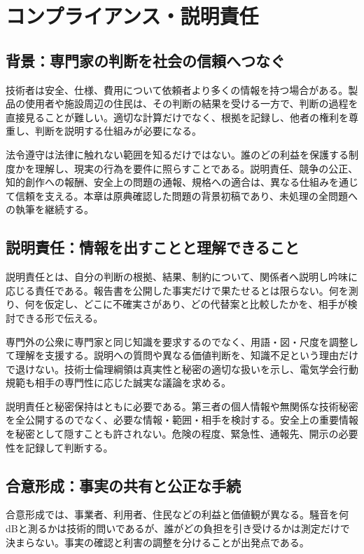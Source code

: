 \chapter{コンプライアンス・説明責任}

\section{背景：専門家の判断を社会の信頼へつなぐ}
技術者は安全、仕様、費用について依頼者より多くの情報を持つ場合がある。製品の使用者や施設周辺の住民は、その判断の結果を受ける一方で、判断の過程を直接見ることが難しい。適切な計算だけでなく、根拠を記録し、他者の権利を尊重し、判断を説明する仕組みが必要になる。

法令遵守は法律に触れない範囲を知るだけではない。誰のどの利益を保護する制度かを理解し、現実の行為を要件に照らすことである。説明責任、競争の公正、知的創作への報酬、安全上の問題の通報、規格への適合は、異なる仕組みを通じて信頼を支える。本章は原典確認した問題の背景初稿であり、未処理の全問題への執筆を継続する。

\section{説明責任：情報を出すことと理解できること}
\label{theory:compliance:accountability}
説明責任とは、自分の判断の根拠、結果、制約について、関係者へ説明し吟味に応じる責任である。報告書を公開した事実だけで果たせるとは限らない。何を測り、何を仮定し、どこに不確実さがあり、どの代替案と比較したかを、相手が検討できる形で伝える。

専門外の公衆に専門家と同じ知識を要求するのでなく、用語・図・尺度を調整して理解を支援する。説明への質問や異なる価値判断を、知識不足という理由だけで退けない。技術士倫理綱領は真実性と秘密の適切な扱いを示し、電気学会行動規範も相手の専門性に応じた誠実な議論を求める\parencite{ipej_ethics2011,ieej_conduct2007}。

説明責任と秘密保持はともに必要である。第三者の個人情報や無関係な技術秘密を全公開するのでなく、必要な情報・範囲・相手を検討する。安全上の重要情報を秘密として隠すことも許されない。危険の程度、緊急性、通報先、開示の必要性を記録して判断する。

\section{合意形成：事実の共有と公正な手続}
\label{theory:compliance:consensus}
合意形成では、事業者、利用者、住民などの利益と価値観が異なる。騒音を何dBと測るかは技術的問いであるが、誰がどの負担を引き受けるかは測定だけで決まらない。事実の確認と利害の調整を分けることが出発点である。

